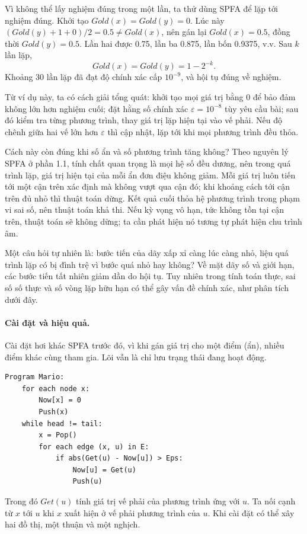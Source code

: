 \documentclass[11pt]{article}
\newcommand{\eps}{\varepsilon}
\begin{document}
Vì không thể lấy nghiệm đúng trong một lần, ta thử dùng SPFA để lặp tới nghiệm
đúng. Khởi tạo \(\mathit{Gold}(x)=\mathit{Gold}(y)=0\). Lúc này
\((\mathit{Gold}(y)+1+0)/2=0.5\ne \mathit{Gold}(x)\), nên gán lại
\(\mathit{Gold}(x)=0.5\), đồng thời \(\mathit{Gold}(y)=0.5\). Lần hai được
0.75, lần ba 0.875, lần bốn 0.9375, v.v. Sau \(k\) lần lặp,
\[
  \mathit{Gold}(x)=\mathit{Gold}(y)=1-2^{-k}.
\]
Khoảng 30 lần lặp đã đạt độ chính xác cấp \(10^{-9}\), và hội tụ đúng về
nghiệm.

Từ ví dụ này, ta có cách giải tổng quát: khởi tạo mọi giá trị bằng 0 để bảo
đảm không lớn hơn nghiệm cuối; đặt hằng số chính xác
\(\eps=10^{-8}\) tùy yêu cầu bài; sau đó kiểm tra từng phương trình, thay giá
trị lặp hiện tại vào vế phải. Nếu độ chênh giữa hai vế lớn hơn \(\eps\) thì
cập nhật, lặp tới khi mọi phương trình đều thỏa.

Cách này còn đúng khi số ẩn và số phương trình tăng không? Theo nguyên lý SPFA
ở phần 1.1, tính chất quan trọng là mọi hệ số đều dương, nên trong quá trình
lặp, giá trị hiện tại của mỗi ẩn đơn điệu không giảm. Mỗi giá trị luôn tiến
tới một cận trên xác định mà không vượt qua cận đó; khi khoảng cách tới cận
trên đủ nhỏ thì thuật toán dừng. Kết quả cuối thỏa hệ phương trình trong phạm
vi sai số, nên thuật toán khả thi. Nếu kỳ vọng vô hạn, tức không tồn tại cận
trên, thuật toán sẽ không dừng; ta cần phát hiện nó tương tự phát hiện chu
trình âm.

Một câu hỏi tự nhiên là: bước tiến của dãy xấp xỉ càng lúc càng nhỏ, liệu quá
trình lặp có bị đình trệ vì bước quá nhỏ hay không? Về mặt dãy số và giới
hạn, các bước tiến tất nhiên giảm dần do hội tụ. Tuy nhiên trong tính toán
thực, sai số số thực và số vòng lặp hữu hạn có thể gây vấn đề chính xác, như
phân tích dưới đây.

\paragraph{Cài đặt và hiệu quả.}
Cài đặt hơi khác SPFA trước đó, vì khi gán giá trị cho một điểm (ẩn), nhiều
điểm khác cùng tham gia. Lõi vẫn là chỉ lưu trạng thái đang hoạt động.
\begin{verbatim}
Program Mario:
    for each node x:
        Now[x] = 0
        Push(x)
    while head != tail:
        x = Pop()
        for each edge (x, u) in E:
            if abs(Get(u) - Now[u]) > Eps:
                Now[u] = Get(u)
                Push(u)
\end{verbatim}
Trong đó \(\mathit{Get}(u)\) tính giá trị vế phải của phương trình ứng với
\(u\). Ta nối cạnh từ \(x\) tới \(u\) khi \(x\) xuất hiện ở vế phải phương
trình của \(u\). Khi cài đặt có thể xây hai đồ thị, một thuận và một nghịch.
\end{document}
